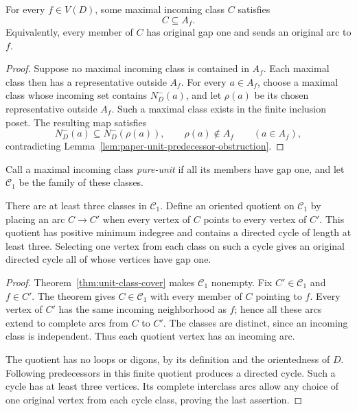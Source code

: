 \begin{theorem}
\label{thm:unit-class-cover}
For every $f\in V(D)$, some maximal incoming class $C$ satisfies
\[
 C\subseteq A_f.
\]
Equivalently, every member of $C$ has original gap one and sends an
original arc to $f$.
\end{theorem}
\begin{proof}
Suppose no maximal incoming class is contained in $A_f$. Each maximal
class then has a representative outside $A_f$. For every $a\in A_f$,
choose a maximal class whose incoming set contains $N_D^-(a)$, and
let $\rho(a)$ be its chosen representative outside $A_f$. Such a
maximal class exists in the finite inclusion poset. The resulting map
satisfies
\[
 N_D^-(a)\subseteq N_D^-(\rho(a)),\qquad
 \rho(a)\notin A_f\qquad(a\in A_f),
\]
contradicting Lemma~\ref{lem:paper-unit-predecessor-obstruction}.
\end{proof}

Call a maximal incoming class \emph{pure-unit} if all its members have
gap one, and let $\mathcal C_1$ be the family of these classes.

\begin{corollary}
\label{cor:paper-unit-class-cycle}
There are at least three classes in $\mathcal C_1$. Define an oriented
quotient on $\mathcal C_1$ by placing an arc $C\to C'$ when every
vertex of $C$ points to every vertex of $C'$. This quotient has positive
minimum indegree and contains a directed cycle of length at least three.
Selecting one vertex from each class on such a cycle gives an original
directed cycle all of whose vertices have gap one.
\end{corollary}
\begin{proof}
Theorem~\ref{thm:unit-class-cover} makes $\mathcal C_1$ nonempty.
Fix $C'\in\mathcal C_1$ and $f\in C'$. The theorem gives
$C\in\mathcal C_1$ with every member of $C$ pointing to $f$.
Every vertex of $C'$ has the same incoming neighborhood as $f$;
hence all these arcs extend to complete arcs from $C$ to $C'$.
The classes are distinct, since an incoming class is independent.
Thus each quotient vertex has an incoming arc.

The quotient has no loops or digons, by its definition and the
orientedness of $D$. Following predecessors in this finite quotient
produces a directed cycle. Such a cycle has at least three vertices.
Its complete interclass arcs allow any choice of one original vertex
from each cycle class, proving the last assertion.
\end{proof}

